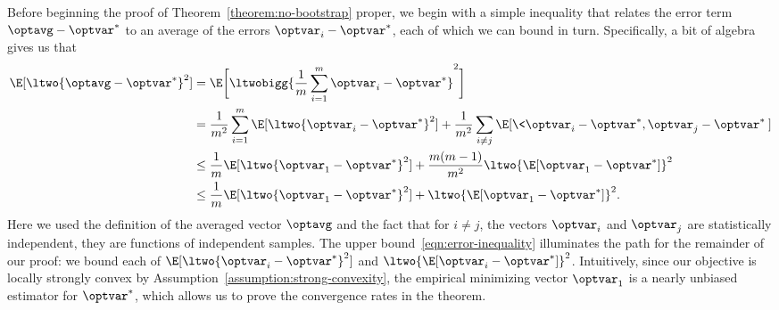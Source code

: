 \documentclass[11pt,twoside]{article}
\theoremstyle{definition}
\begin{document}
Before beginning the proof of Theorem~\ref{theorem:no-bootstrap}
proper, we begin with a simple inequality that relates the error term
$\optavg - \optvar^*$ to an average of the errors $\optvar_i -
\optvar^*$, each of which we can bound in turn. Specifically, a bit of
algebra gives us that
\begin{align}
  \E[\ltwo{\optavg - \optvar^*}^2] & = \E\bigg[\ltwobigg{\frac{1}{m}
      \sum_{i=1}^m \optvar_i - \optvar^*}^2\bigg] \nonumber \\
%
 & = \frac{1}{m^2} \sum_{i=1}^m \E[\ltwo{\optvar_i - \optvar^*}^2] +
  \frac{1}{m^2} \sum_{i \neq j} \E[\<\optvar_i - \optvar^*, \optvar_j
    - \optvar^*\>] \nonumber \\
%
 & \le \frac{1}{m} \E[\ltwo{\optvar_1 - \optvar^*}^2] + \frac{m(m -
    1)}{m^2} \ltwo{\E[\optvar_1 - \optvar^*]}^2 \nonumber \\
%
  & \le \frac{1}{m} \E[\ltwo{\optvar_1 - \optvar^*}^2] +
  \ltwo{\E[\optvar_1 - \optvar^*]}^2.
  \label{eqn:error-inequality}
\end{align}
Here we used the definition of the averaged vector $\optavg$ and the
fact that for $i \neq j$, the vectors $\optvar_i$ and $\optvar_j$ are
statistically independent, they are functions of independent
samples. The upper bound~\eqref{eqn:error-inequality} illuminates the
path for the remainder of our proof: we bound each of
$\E[\ltwo{\optvar_i - \optvar^*}^2]$ and $\ltwo{\E[\optvar_i -
    \optvar^*]}^2$. Intuitively, since our objective is locally
strongly convex by Assumption~\ref{assumption:strong-convexity}, the
empirical minimizing vector $\optvar_1$ is a nearly unbiased estimator
for $\optvar^*$, which allows us to prove the convergence rates in the
theorem.
\end{document}
